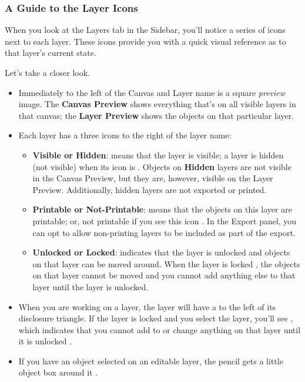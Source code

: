 \documentclass[../main.tex]{subfiles}
\begin{document}
\subsubsection{A Guide to the Layer Icons}

When you look at the Layers tab in the Sidebar, you'll notice a series of icons next to each
layer. These icons provide you with a quick visual reference as to that layer's current state.

Let's take a closer look.


\begin{itemize}
  \item Immediately to the left of the Canvas and Layer name is a square \textit{preview} image.
    The \textbf{Canvas Preview} shows everything that's on all visible layers in that canvas;
    the \textbf{Layer Preview} shows the objects on that particular layer.
  \item Each layer has a three icons to the right of the layer name:

    \begin{itemize}
      \item \textbf{Visible or Hidden}:  means that
        the layer is visible; a layer is hidden (not visible) when its icon is
        . Objects on \textbf{Hidden} layers are not
        visible in the Canvas Preview, but they are, however, visible on the Layer Preview.
        Additionally, hidden layers are not exported or printed.
      \item \textbf{Printable or Not-Printable}: 
        means that the objects on this layer are printable; or, not printable if you see this icon
        . In the Export panel, you can opt to
        allow non-printing layers to be included as part of the export.
      \item \textbf{Unlocked or Locked}: 
        indicates that the layer is unlocked and objects on that layer can be moved around. When
        the layer is locked , the objects on that
        layer cannot be moved and you cannot add anything else to that layer until the layer is
        unlocked.
    \end{itemize}
  \item When you are working on a layer, the layer will have a
     to the left of its disclosure
    triangle. If the layer is locked and you select the layer, you'll see
    , which indicates that you cannot add
    to or change anything on that layer until it is unlocked
    .
  \item If you have an object selected on an editable layer, the pencil gets a little object box
    around it .
\end{itemize}
\end{document}
